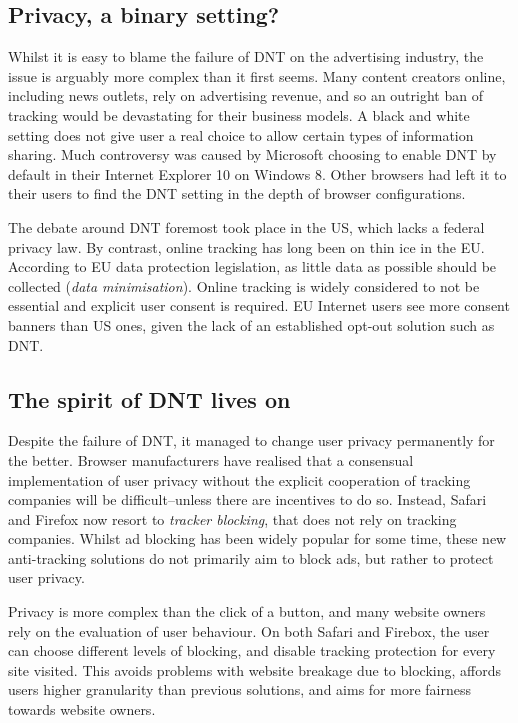 \documentclass[
]{book}
\begin{document}
\hypertarget{privacy-a-binary-setting}{%
\subsection{Privacy, a binary setting?}\label{privacy-a-binary-setting}}

Whilst it is easy to blame the failure of DNT on the advertising industry, the issue is arguably more complex than it first seems. Many content creators online, including news outlets, rely on advertising revenue, and so an outright ban of tracking would be devastating for their business models. A black and white setting does not give user a real choice to allow certain types of information sharing. Much controversy was caused by Microsoft choosing to enable DNT by default in their Internet Explorer 10 on Windows 8. Other browsers had left it to their users to find the DNT setting in the depth of browser configurations.

The debate around DNT foremost took place in the US, which lacks a federal privacy law. By contrast, online tracking has long been on thin ice in the EU. According to EU data protection legislation, as little data as possible should be collected (\emph{data minimisation}). Online tracking is widely considered to not be essential and explicit user consent is required. EU Internet users see more consent banners than US ones, given the lack of an established opt-out solution such as DNT.

\hypertarget{the-spirit-of-dnt-lives-on}{%
\subsection{The spirit of DNT lives on}\label{the-spirit-of-dnt-lives-on}}

Despite the failure of DNT, it managed to change user privacy permanently for the better. Browser manufacturers have realised that a consensual implementation of user privacy without the explicit cooperation of tracking companies will be difficult--unless there are incentives to do so. Instead, Safari and Firefox now resort to \emph{tracker blocking}, that does not rely on tracking companies. Whilst ad blocking has been widely popular for some time, these new anti-tracking solutions do not primarily aim to block ads, but rather to protect user privacy.

Privacy is more complex than the click of a button, and many website owners rely on the evaluation of user behaviour. On both Safari and Firebox, the user can choose different levels of blocking, and disable tracking protection for every site visited. This avoids problems with website breakage due to blocking, affords users higher granularity than previous solutions, and aims for more fairness towards website owners.
\end{document}
